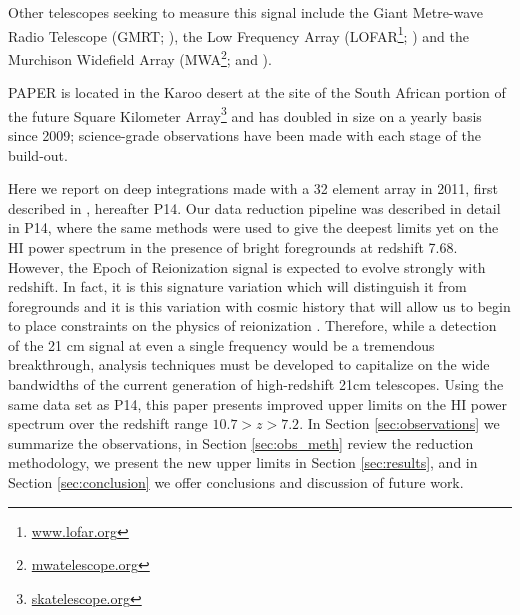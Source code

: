 \documentclass[preprint2]{aastex}
\begin{document}
Other telescopes seeking to measure this signal include the Giant Metre-wave Radio Telescope (GMRT; \cite{Paciga:2013p9943}), the Low Frequency Array (LOFAR\footnote{\url{www.lofar.org}}; \cite{Yatawatta:2013p9699}) and the Murchison Widefield Array (MWA\footnote{\url{mwatelescope.org}}; \cite{Bowman:2013p9950} and \cite{Tingay:2013p9022}). 



PAPER is located in the Karoo desert at the site of the South African portion of the future Square Kilometer Array\footnote{\url{skatelescope.org}} and has doubled in size on a yearly basis since 2009; science-grade observations have been made with each stage of the build-out.  

Here we report on deep integrations made with a 32 element array in 2011, first described in \cite{Parsons:2014p10499}, hereafter P14.  Our data reduction pipeline was described in detail in P14, where the same methods were used to give the deepest limits yet on the HI power spectrum in the presence of bright foregrounds at redshift 7.68.  However, the Epoch of Reionization signal is expected to evolve strongly with redshift. In fact, it is this signature variation which will distinguish it from foregrounds and it is this variation with cosmic history that will allow us to begin to place constraints on the physics of reionization \citep{Pritchard:2008p8123,Pober:2014p10390}.  Therefore, while a detection of the 21 cm signal at even a single frequency would be a tremendous breakthrough, analysis techniques must be developed to capitalize on the wide bandwidths of the current generation of high-redshift 21cm telescopes.  Using the same data set as P14, this paper presents improved upper limits on the HI power spectrum over the redshift range $10.7>z>7.2$.  In Section  \ref{sec:observations} we summarize the observations, in Section \ref{sec:obs_meth} review the reduction methodology, we present the new upper limits in Section \ref{sec:results}, and in Section \ref{sec:conclusion} we offer conclusions and discussion of future work.
\end{document}
